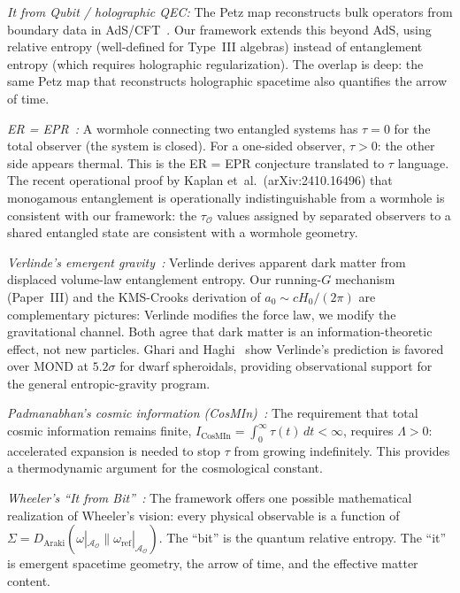 \documentclass[prd,twocolumn,superscriptaddress,longbibliography,floatfix]{revtex4-2}
\newcommand{\tauasym}{\tau}
\newcommand{\Daraki}{D_{\mathrm{Araki}}}
\newcommand{\Aobs}{\mathcal{A}_{\mathcal{O}}}
\newcommand{\tauO}{\tauasym_{\mathcal{O}}}
\begin{document}
\emph{It from Qubit / holographic QEC:} The Petz
map reconstructs bulk operators from boundary data
in AdS/CFT~\cite{Cotler2019}.  Our framework
extends this beyond AdS, using relative entropy
(well-defined for Type~III algebras)
instead of entanglement entropy (which requires
holographic regularization).  The overlap is deep:
the same Petz map that reconstructs holographic
spacetime also quantifies the arrow of time.

\emph{ER = EPR~\cite{MaldacenaSusskind2013}:} A wormhole
connecting two entangled systems has $\tauasym = 0$ for
the total observer (the system is closed).  For a
one-sided observer, $\tauasym > 0$: the other side
appears thermal.  This is the ER = EPR
conjecture translated to $\tauasym$ language.
The recent operational proof by Kaplan et~al.\
(arXiv:2410.16496) that monogamous entanglement is
operationally indistinguishable from a wormhole is
consistent with our framework: the $\tauO$ values
assigned by separated observers to a shared entangled
state are consistent with a wormhole geometry.

\emph{Verlinde's emergent gravity~\cite{Verlinde2016}:}
Verlinde derives apparent dark matter from displaced
volume-law entanglement entropy.
Our running-$G$ mechanism (Paper~III) and the
KMS-Crooks derivation of $a_0 \sim cH_0/(2\pi)$
are complementary pictures: Verlinde modifies the
force law, we modify the gravitational channel.  Both
agree that dark matter is an information-theoretic effect,
not new particles.  Ghari and
Haghi~\cite{GhariHaghi2026} show Verlinde's prediction
is favored over MOND at $5.2\sigma$ for dwarf
spheroidals, providing observational support for the
general entropic-gravity program.

\emph{Padmanabhan's cosmic information
(CosMIn)~\cite{Padmanabhan2017}:}
The requirement that total cosmic information remains
finite, $I_{\mathrm{CosMIn}} = \int_0^\infty
\tauasym(t)\,dt < \infty$, requires $\Lambda > 0$:
accelerated expansion is needed to stop $\tauasym$
from growing indefinitely.  This provides a
thermodynamic argument for the cosmological
constant.

\emph{Wheeler's ``It from Bit''~\cite{Wheeler1990}:}
The framework offers one possible mathematical realization
of Wheeler's vision:
every physical observable is a function of
$\Sigma = \Daraki(\omega|_{\Aobs}\|
\omega_{\mathrm{ref}}|_{\Aobs})$.
The ``bit'' is the quantum relative entropy.
The ``it'' is emergent spacetime geometry, the arrow
of time, and the effective matter content.
\end{document}
